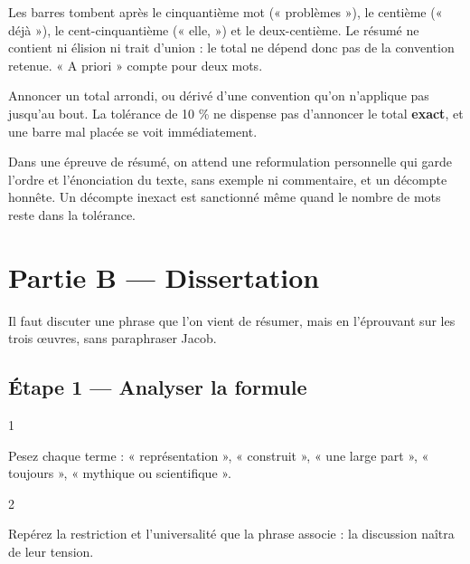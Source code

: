 \documentclass[11pt,a4paper]{article}
\begin{document}
Les barres tombent après le cinquantième mot (« problèmes »), le centième (« déjà »), le cent-cinquantième (« elle, ») et le deux-centième. Le résumé ne contient ni élision ni trait d'union : le total ne dépend donc pas de la convention retenue. « A priori » compte pour deux mots.

\begin{piege}

Annoncer un total arrondi, ou dérivé d'une convention qu'on n'applique pas jusqu'au bout. La tolérance de 10 \% ne dispense pas d'annoncer le total \textbf{exact}, et une barre mal placée se voit immédiatement.

\end{piege}

\begin{jury}

Dans une épreuve de résumé, on attend une reformulation personnelle qui garde l'ordre et l'énonciation du texte, sans exemple ni commentaire, et un décompte honnête. Un décompte inexact est sanctionné même quand le nombre de mots reste dans la tolérance.

\end{jury}

\hypertarget{partie-b-dissertation}{%
\section{Partie B --- Dissertation}\label{partie-b-dissertation}}

Il faut discuter une phrase que l'on vient de résumer, mais en l'éprouvant sur les trois œuvres, sans paraphraser Jacob.

\hypertarget{uxe9tape-1-analyser-la-formule}{%
\subsection{Étape 1 --- Analyser la formule}\label{uxe9tape-1-analyser-la-formule}}

\begin{indication}{1}

Pesez chaque terme : « représentation », « construit », « une large part », « toujours », « mythique ou scientifique ».

\end{indication}

\begin{indication}{2}

Repérez la restriction et l'universalité que la phrase associe : la discussion naîtra de leur tension.

\end{indication}
\end{document}
